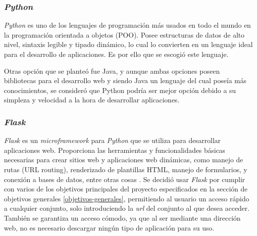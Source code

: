 \subsubsection{\textit{Python}}
\textit{Python} es uno de los lenguajes de programación más usados en todo el mundo en la programación orientada a objetos (POO). Posee estructuras de datos de alto nivel, sintaxis legible y tipado dinámico, lo cual lo convierten en un lenguaje ideal para el desarrollo de aplicaciones. Es por ello que se escogió este lenguaje.\cite{python}

Otras opción que se planteó fue Java, y aunque ambas opciones poseen bibliotecas para el desarrollo web y siendo Java un lenguaje del cual poseía más conocimientos, se consideró que Python podría ser mejor opción debido a su simpleza y velocidad a la hora de desarrollar aplicaciones.

\subsubsection{\textit{Flask}}\label{flask}
\textit{Flask} es un \textit{microframework} para \textit{Python} que se utiliza para desarrollar aplicaciones web. Proporciona las herramientas y funcionalidades básicas necesarias para crear sitios web y aplicaciones web dinámicas, como manejo de rutas (URL routing), renderizado de plantillas HTML, manejo de formularios, y conexión a bases de datos, entre otras cosas \cite{FlaskSite}. 
Se decidió usar \textit{Flask} por cumplir con varios de los objetivos principales del proyecto especificados en la sección de objetivos generales \ref{objetivos-generales}, permitiendo al usuario un acceso rápido a cualquier conjunto, solo introduciendo la \textit{url} del conjunto al que desea acceder. También se garantiza un acceso cómodo, ya que al ser mediante una dirección web, no es necesario descargar ningún tipo de aplicación para su uso.

